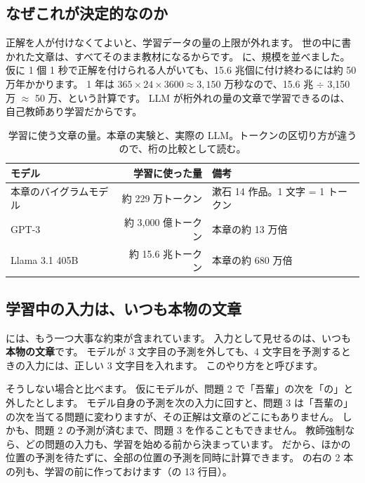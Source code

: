 \subsection*{なぜこれが決定的なのか}

正解を人が付けなくてよいと、学習データの量の上限が外れます。
世の中に書かれた文章は、すべてそのまま教材になるからです。
に、規模を並べました。
仮に 1 個 1 秒で正解を付けられる人がいても、15.6 兆個に付け終わるには約 50 万年かかります。
1 年は $365\times24\times3600\approx3{,}150$ 万秒なので、15.6 兆 $\div$ 3,150 万 $\approx$ 50 万、という計算です。
LLM が桁外れの量の文章で学習できるのは、自己教師あり学習だからです。

\begin{table}[tbp]
\centering
\caption{学習に使う文章の量。本章の実験と、実際の LLM。トークンの区切り方が違うので、桁の比較として読む。}
\label{tab:lm-scale}
\small
\begin{tabular}{lrl}
\toprule
モデル & 学習に使った量 & 備考 \\
\midrule
本章のバイグラムモデル & 約 229 万トークン & 漱石 14 作品。1 文字 = 1 トークン \\
GPT-3\cite{brown2020language} & 約 3,000 億トークン & 本章の約 13 万倍 \\
Llama 3.1 405B\cite{dubey2024llama3} & 約 15.6 兆トークン & 本章の約 680 万倍 \\
\bottomrule
\end{tabular}
\end{table}

\subsection*{学習中の入力は、いつも本物の文章}

には、もう一つ大事な約束が含まれています。
入力として見せるのは、いつも\textbf{本物の文章}です。
モデルが 3 文字目の予測を外しても、4 文字目を予測するときの入力には、正しい 3 文字目を入れます。
このやり方をと呼びます。

そうしない場合と比べます。
仮にモデルが、問題 2 で「吾輩」の次を「の」と外したとします。
モデル自身の予測を次の入力に回すと、問題 3 は「吾輩の」の次を当てる問題に変わりますが、その正解は文章のどこにもありません。
しかも、問題 2 の予測が済むまで、問題 3 を作ることもできません。
教師強制なら、どの問題の入力も、学習を始める前から決まっています。
だから、ほかの位置の予測を待たずに、全部の位置の予測を同時に計算できます。
の右の 2 本の列も、学習の前に作っておけます（の 13 行目）。

